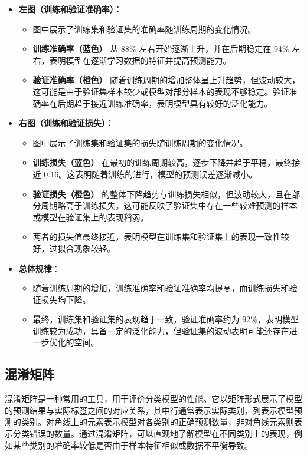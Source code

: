 \begin{itemize}
    \item \textbf{左图（训练和验证准确率）}：
    \begin{itemize}
        \item 图中展示了训练集和验证集的准确率随训练周期的变化情况。
        \item \textbf{训练准确率（蓝色）} 从 88\% 左右开始逐渐上升，并在后期稳定在 94\% 左右，表明模型在逐渐学习数据的特征并提高预测能力。
        \item \textbf{验证准确率（橙色）} 随着训练周期的增加整体呈上升趋势，但波动较大，这可能是由于验证集样本较少或模型对部分样本的表现不够稳定。验证准确率在后期趋于接近训练准确率，表明模型具有较好的泛化能力。
    \end{itemize}

    \item \textbf{右图（训练和验证损失）}：
    \begin{itemize}
        \item 图中展示了训练集和验证集的损失随训练周期的变化情况。
        \item \textbf{训练损失（蓝色）} 在最初的训练周期较高，逐步下降并趋于平稳，最终接近 0.16。这表明随着训练的进行，模型的预测误差逐渐减小。
        \item \textbf{验证损失（橙色）} 的整体下降趋势与训练损失相似，但波动较大，且在部分周期略高于训练损失。这可能反映了验证集中存在一些较难预测的样本或模型在验证集上的表现稍弱。
        \item 两者的损失值最终接近，表明模型在训练集和验证集上的表现一致性较好，过拟合现象较轻。
    \end{itemize}

    \item \textbf{总体规律}：
    \begin{itemize}
        \item 随着训练周期的增加，训练准确率和验证准确率均提高，而训练损失和验证损失均下降。
        \item 最终，训练集和验证集的表现趋于一致，验证准确率约为 92\%，表明模型训练较为成功，具备一定的泛化能力，但验证集的波动表明可能还存在进一步优化的空间。
    \end{itemize}
\end{itemize}

\subsection{混淆矩阵}
混淆矩阵是一种常用的工具，用于评价分类模型的性能。它以矩阵形式展示了模型的预测结果与实际标签之间的对应关系，其中行通常表示实际类别，列表示模型预测的类别。对角线上的元素表示模型对各类别的正确预测数量，非对角线元素则表示分类错误的数量。通过混淆矩阵，可以直观地了解模型在不同类别上的表现，例如某些类别的准确率较低是否由于样本特征相似或数据不平衡导致。

